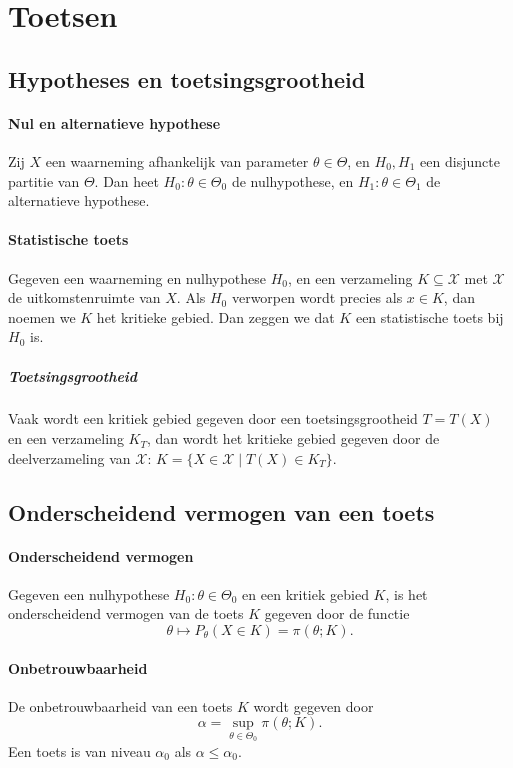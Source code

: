 \section{Toetsen}
\subsection{Hypotheses en toetsingsgrootheid}
\paragraph{Nul en alternatieve hypothese} Zij \(X\) een waarneming afhankelijk
van parameter \(\theta\in\Theta\), en \(H_{0},H_{1}\) een disjuncte partitie van
\(\Theta\). Dan heet \(H_{0}:\theta\in\Theta_{0}\) de nulhypothese, en
\(H_{1}:\theta\in\Theta_{1}\) de alternatieve hypothese.

\paragraph{Statistische toets} Gegeven een waarneming en nulhypothese \(H_{0}\),
en een verzameling \(K\subseteq\mathcal{X}\) met \(\mathcal{X}\) de
uitkomstenruimte van \(X\). Als \(H_{0}\) verworpen wordt precies als \(x\in K\),
dan noemen we \(K\) het kritieke gebied. Dan zeggen we dat \(K\) een statistische
toets bij \(H_{0}\) is.

\subparagraph{Toetsingsgrootheid} Vaak wordt een kritiek gebied gegeven door een
toetsingsgrootheid \(T=T(X)\) en een verzameling \(K_{T}\), dan wordt het
kritieke gebied gegeven door de deelverzameling van \(\mathcal{X}\):
\(K=\{X\in\mathcal{X}\mid T(X)\in K_{T}\}\).

\subsection{Onderscheidend vermogen van een toets}
\paragraph{Onderscheidend vermogen} Gegeven een nulhypothese
\(H_{0}:\theta\in\Theta_{0}\) en een kritiek gebied \(K\), is het
onderscheidend vermogen van de toets \(K\) gegeven door de functie
\[
    \theta\mapsto P_{\theta}(X\in K)=\pi(\theta;K).
\]

\paragraph{Onbetrouwbaarheid} De onbetrouwbaarheid van een toets \(K\) wordt
gegeven door
\[
    \alpha=\sup_{\theta\in\Theta_{0}}\pi(\theta;K).
\]
Een toets is van niveau \(\alpha_{0}\) als \(\alpha\leq\alpha_{0}\).

